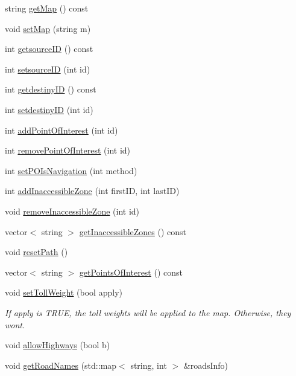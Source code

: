 \begin{DoxyCompactItemize}
\item 
string \hyperlink{class_easy_pilot_aed5bc5d07b19f6c4ed75738c85fd9cd0}{get\+Map} () const 
\item 
void \hyperlink{class_easy_pilot_ad39f859cf5dcc2b1d8c97e1cb098b1af}{set\+Map} (string m)
\item 
int \hyperlink{class_easy_pilot_a41d023b67a6e3d2ee303cc8e65b326ed}{getsource\+I\+D} () const 
\item 
int \hyperlink{class_easy_pilot_a883991b124225932e5b683c2d09ce464}{setsource\+I\+D} (int id)
\item 
int \hyperlink{class_easy_pilot_acd4716401c9b31adcc121311361f516d}{getdestiny\+I\+D} () const 
\item 
int \hyperlink{class_easy_pilot_a16a15fa19114daf0b59a40f976fcc5a1}{setdestiny\+I\+D} (int id)
\item 
int \hyperlink{class_easy_pilot_a66c58ddfc69633955e44f81ed206a7c9}{add\+Point\+Of\+Interest} (int id)
\item 
int \hyperlink{class_easy_pilot_a24988647f06c8ebfb208775e491a2549}{remove\+Point\+Of\+Interest} (int id)
\item 
int \hyperlink{class_easy_pilot_a462212efecccb55922602dda01f35e01}{set\+P\+O\+Is\+Navigation} (int method)
\item 
int \hyperlink{class_easy_pilot_aaf295c560bda9154e7246b22525d44f7}{add\+Inaccessible\+Zone} (int first\+I\+D, int last\+I\+D)
\item 
void \hyperlink{class_easy_pilot_a317650cbaa0b9d460bb3298b6b75ac40}{remove\+Inaccessible\+Zone} (int id)
\item 
vector$<$ string $>$ \hyperlink{class_easy_pilot_a5421dd20a6a8a5f29014087fd8323b62}{get\+Inaccessible\+Zones} () const 
\item 
void \hyperlink{class_easy_pilot_a74db0871ef17ad333bf22d8b261fbe2f}{reset\+Path} ()
\item 
vector$<$ string $>$ \hyperlink{class_easy_pilot_a07b3d6386b5e59df00df536c123d56fb}{get\+Points\+Of\+Interest} () const 
\item 
void \hyperlink{class_easy_pilot_aaed66da7454f6181e445f0219ceda0bb}{set\+Toll\+Weight} (bool apply)
\begin{DoxyCompactList}\small\item\em If apply is T\+R\+U\+E, the toll weights will be applied to the map. Otherwise, they won\textquotesingle{}t. \end{DoxyCompactList}\item 
void \hyperlink{class_easy_pilot_ad7a6abdd782c33e553b0fa08d2119d8b}{allow\+Highways} (bool b)
\item 
void \hyperlink{class_easy_pilot_a0711a7d369215006690e6265a34f092b}{get\+Road\+Names} (std\+::map$<$ string, int $>$ \&roads\+Info)
\end{DoxyCompactItemize}


